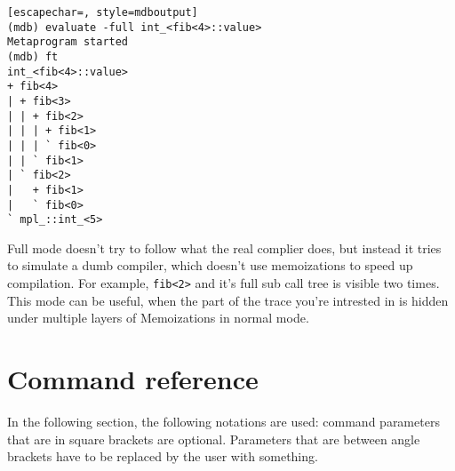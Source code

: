 \begin{lstlisting}[escapechar=, style=mdboutput]
(mdb) evaluate -full int_<fib<4>::value>
Metaprogram started
(mdb) ft
int_<fib<4>::value>
+ fib<4>
| + fib<3>
| | + fib<2>
| | | + fib<1>
| | | ` fib<0>
| | ` fib<1>
| ` fib<2>
|   + fib<1>
|   ` fib<0>
` mpl_::int_<5>
\end{lstlisting}

\lstset{
    numbers=left
}

Full mode doesn't try to follow what the real complier does, but instead it
tries to simulate a dumb compiler, which doesn't use memoizations to speed up
compilation. For example, \texttt{fib<2>} and it's full sub call tree is
visible two times. This mode can be useful, when the part of the trace you're
intrested in is hidden under multiple layers of Memoizations in normal mode.

\section{Command reference}

In the following section, the following notations are used: command parameters
that are in square brackets are optional. Parameters that are between angle
brackets have to be replaced by the user with something.



